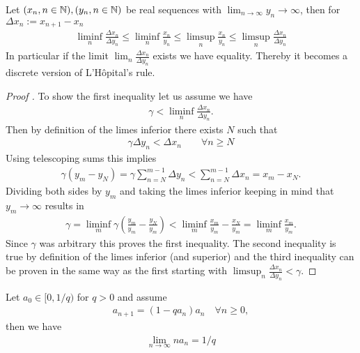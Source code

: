 \begin{theorem}\label{thm-appendix: cesaro-stolz}
	Let \((x_n, n\in\mathbb{N}),(y_n, n\in\mathbb{N})\) be real sequences with
	\(\lim_{n\to\infty}y_n\to\infty\), then for \(\Delta x_n:=x_{n+1}-x_n\)
	\begin{align}
		\liminf_n \frac{\Delta x_n}{\Delta y_n}
		\le \liminf_n \frac{x_n}{y_n} 
		\le \limsup_n \frac{x_n}{y_n} 
		\le \limsup_n \frac{\Delta x_n}{\Delta y_n}
	\end{align}
	In particular if the limit \(\lim_n\frac{\Delta x_n}{\Delta y_n}\) exists
	we have equality. Thereby it becomes a discrete version of L'Hôpital's
	rule.
\end{theorem}
\begin{proof}[{Proof \parencite{IMOmathHopitalTheorem}}]
	To show the first inequality let us assume we have
	\begin{align*}
		\gamma < \liminf_n \frac{\Delta x_n}{\Delta y_n}.
	\end{align*}
	Then by definition of the limes inferior there exists \(N\) such that
	\begin{align*}
		\gamma \Delta y_n < \Delta x_n \qquad \forall n\ge N
	\end{align*}
	Using telescoping sums this implies
	\begin{align*}
		\gamma (y_m- y_N)
		= \gamma \sum_{n=N}^{m-1} \Delta y_n
		< \sum_{n=N}^{m-1} \Delta x_n
		= x_m- x_N.
	\end{align*}
	Dividing both sides by \(y_m\) and taking the limes inferior keeping in
	mind that \(y_m\to\infty\) results in
	\begin{align*}
		\gamma = \liminf_m \gamma\left(\frac{y_m}{y_m} - \frac{y_N}{y_m}\right)
		< \liminf_m \frac{x_m}{y_m} - \frac{x_N}{y_m}
		= \liminf_m \frac{x_m}{y_m}.
	\end{align*}
	Since \(\gamma\) was arbitrary this proves the first inequality. The second
	inequality is true by definition of the limes inferior (and superior) and the
	third inequality can be proven in the same way as the first starting with
	\(\limsup_n \frac{\Delta x_n}{\Delta y_n} < \gamma\).
\end{proof}
\begin{lemma}
	\label{lem-appendix: diminishing contraction}
	Let \(a_0 \in [0, 1/q)\) for \(q>0\) and assume 
	\begin{align*}
		a_{n+1} = (1-q a_n)a_n \quad \forall n \ge 0,
	\end{align*}
	then we have
	\begin{align}
		\lim_{n\to\infty} n a_n = 1/q
	\end{align}
\end{lemma}
